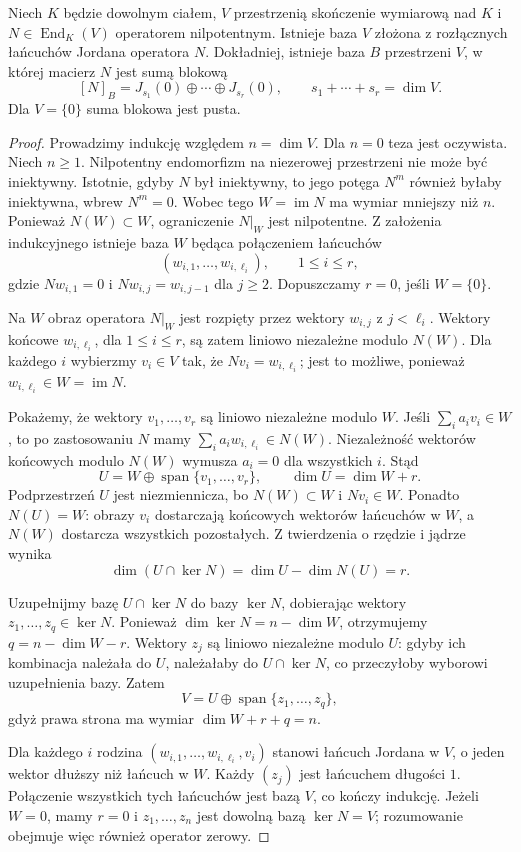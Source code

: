 \begin{twierdzenie}
\label{thm:lin17-nilpotent-jordan}
Niech \(K\) będzie dowolnym ciałem,
\(V\) przestrzenią skończenie wymiarową nad \(K\)
i \(N\in\operatorname{End}_K(V)\)
operatorem nilpotentnym.
Istnieje baza \(V\) złożona z rozłącznych
łańcuchów Jordana operatora \(N\).
Dokładniej, istnieje baza \(B\) przestrzeni \(V\),
w której macierz \(N\) jest sumą blokową
\[
 [N]_B=J_{s_1}(0)\oplus\cdots\oplus J_{s_r}(0),
 \qquad s_1+\cdots+s_r=\dim V.
\]
Dla \(V=\{0\}\) suma blokowa jest pusta.
\end{twierdzenie}
\begin{proof}
Prowadzimy indukcję względem \(n=\dim V\).
Dla \(n=0\) teza jest oczywista.
Niech \(n\ge1\).
Nilpotentny endomorfizm na niezerowej przestrzeni
nie może być iniektywny.
Istotnie, gdyby \(N\) był iniektywny,
to jego potęga \(N^m\) również byłaby
iniektywna, wbrew \(N^m=0\).
Wobec tego \(W=\operatorname{im}N\)
ma wymiar mniejszy niż \(n\).
Ponieważ \(N(W)\subset W\),
ograniczenie \(N|_W\) jest nilpotentne.
Z założenia indukcyjnego istnieje baza \(W\)
będąca połączeniem łańcuchów
\[
 (w_{i,1},\ldots,w_{i,\ell_i}),
 \qquad 1\le i\le r,
\]
gdzie \(Nw_{i,1}=0\) i
\(Nw_{i,j}=w_{i,j-1}\) dla \(j\ge2\).
Dopuszczamy \(r=0\), jeśli \(W=\{0\}\).

Na \(W\) obraz operatora \(N|_W\)
jest rozpięty przez wektory
\(w_{i,j}\) z \(j<\ell_i\).
Wektory końcowe \(w_{i,\ell_i}\),
dla \(1\le i\le r\), są zatem
liniowo niezależne modulo \(N(W)\).
Dla każdego \(i\) wybierzmy \(v_i\in V\)
tak, że \(Nv_i=w_{i,\ell_i}\);
jest to możliwe, ponieważ \(w_{i,\ell_i}\in W=\operatorname{im}N\).

Pokażemy, że wektory \(v_1,\ldots,v_r\)
są liniowo niezależne modulo \(W\).
Jeśli \(\sum_i a_iv_i\in W\),
to po zastosowaniu \(N\) mamy
\(\sum_i a_iw_{i,\ell_i}\in N(W)\).
Niezależność wektorów końcowych modulo \(N(W)\)
wymusza \(a_i=0\) dla wszystkich \(i\).
Stąd
\[
 U=W\oplus\operatorname{span}\{v_1,\ldots,v_r\},
 \qquad \dim U=\dim W+r.
\]
Podprzestrzeń \(U\) jest niezmiennicza,
bo \(N(W)\subset W\) i \(Nv_i\in W\).
Ponadto \(N(U)=W\):
obrazy \(v_i\) dostarczają końcowych
wektorów łańcuchów w \(W\),
a \(N(W)\) dostarcza wszystkich pozostałych.
Z twierdzenia o rzędzie i jądrze wynika
\[
 \dim(U\cap\ker N)
 =\dim U-\dim N(U)=r.
\]

Uzupełnijmy bazę \(U\cap\ker N\)
do bazy \(\ker N\), dobierając
wektory \(z_1,\ldots,z_q\in\ker N\).
Ponieważ \(\dim\ker N=n-\dim W\),
otrzymujemy \(q=n-\dim W-r\).
Wektory \(z_j\) są liniowo niezależne
modulo \(U\): gdyby ich kombinacja
należała do \(U\), należałaby
do \(U\cap\ker N\), co przeczyłoby
wyborowi uzupełnienia bazy.
Zatem
\[
 V=U\oplus\operatorname{span}\{z_1,\ldots,z_q\},
\]
gdyż prawa strona ma wymiar
\(\dim W+r+q=n\).

Dla każdego \(i\) rodzina
\((w_{i,1},\ldots,w_{i,\ell_i},v_i)\)
stanowi łańcuch Jordana w \(V\),
o jeden wektor dłuższy niż łańcuch w \(W\).
Każdy \((z_j)\) jest łańcuchem długości \(1\).
Połączenie wszystkich tych łańcuchów
jest bazą \(V\), co kończy indukcję.
Jeżeli \(W=0\), mamy \(r=0\) i
\(z_1,\ldots,z_n\) jest dowolną bazą
\(\ker N=V\); rozumowanie obejmuje więc
również operator zerowy.
\end{proof}


